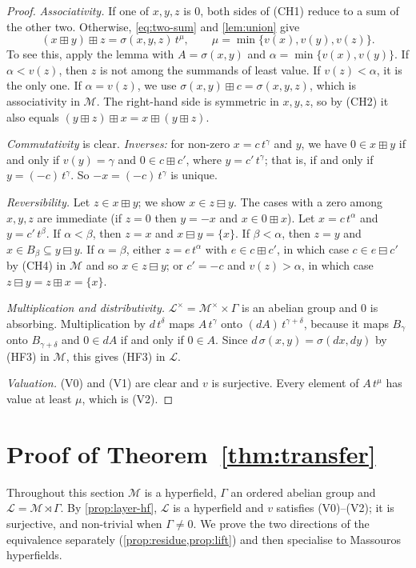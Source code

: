 \documentclass[11pt]{amsart}
\numberwithin{equation}{section}
\newcommand{\hplus}{\boxplus}
\newcommand{\hminus}{\boxminus}
\newcommand{\Mas}{\mathcal M}
\newcommand{\Lay}{\mathcal L}
\newcommand{\lt}[2]{#1\,t^{#2}}
\begin{document}
\begin{proof}
\emph{Associativity.} If one of $x,y,z$ is $0$, both sides of (CH1) reduce to a sum of the other two. Otherwise, \eqref{eq:two-sum} and \cref{lem:union} give
\[
 (x\hplus y)\hplus z=\lt{\sigma(x,y,z)}{\mu},\qquad \mu=\min\{v(x),v(y),v(z)\}.
\]
To see this, apply the lemma with $A=\sigma(x,y)$ and $\alpha=\min\{v(x),v(y)\}$. If $\alpha<v(z)$, then $z$ is not among the summands of least value. If $v(z)<\alpha$, it is the only one. If $\alpha=v(z)$, we use $\sigma(x,y)\hplus c=\sigma(x,y,z)$, which is associativity in $\Mas$. The right-hand side is symmetric in $x,y,z$, so by (CH2) it also equals $(y\hplus z)\hplus x=x\hplus(y\hplus z)$.

\emph{Commutativity} is clear. \emph{Inverses:} for non-zero $x=c\,t^\gamma$ and $y$, we have $0\in x\hplus y$ if and only if $v(y)=\gamma$ and $0\in c\hplus c'$, where $y=c'\,t^\gamma$; that is, if and only if $y=(-c)\,t^\gamma$. So $-x=(-c)\,t^\gamma$ is unique.

\emph{Reversibility.} Let $z\in x\hplus y$; we show $x\in z\hminus y$. The cases with a zero among $x,y,z$ are immediate (if $z=0$ then $y=-x$ and $x\in 0\hplus x$). Let $x=c\,t^\alpha$ and $y=c'\,t^\beta$. If $\alpha<\beta$, then $z=x$ and $x\hminus y=\{x\}$. If $\beta<\alpha$, then $z=y$ and $x\in B_\beta\subseteq y\hminus y$. If $\alpha=\beta$, either $z=e\,t^\alpha$ with $e\in c\hplus c'$, in which case $c\in e\hminus c'$ by (CH4) in $\Mas$ and so $x\in z\hminus y$; or $c'=-c$ and $v(z)>\alpha$, in which case $z\hminus y=z\hplus x=\{x\}$.

\emph{Multiplication and distributivity.} $\Lay^\times=\Mas^\times\times\Gamma$ is an abelian group and $0$ is absorbing. Multiplication by $d\,t^\delta$ maps $\lt{A}{\gamma}$ onto $\lt{(dA)}{\gamma+\delta}$, because it maps $B_\gamma$ onto $B_{\gamma+\delta}$ and $0\in dA$ if and only if $0\in A$. Since $d\,\sigma(x,y)=\sigma(dx,dy)$ by (HF3) in $\Mas$, this gives (HF3) in $\Lay$.

\emph{Valuation.} (V0) and (V1) are clear and $v$ is surjective. Every element of $\lt{A}{\mu}$ has value at least $\mu$, which is (V2).
\end{proof}

\section{Proof of Theorem~\ref{thm:transfer}}\label{sec:B}

Throughout this section $\Mas$ is a hyperfield, $\Gamma$ an ordered abelian group and $\Lay=\Mas\rtimes\Gamma$. By \cref{prop:layer-hf}, $\Lay$ is a hyperfield and $v$ satisfies (V0)--(V2); it is surjective, and non-trivial when $\Gamma\ne0$. We prove the two directions of the equivalence separately (\cref{prop:residue,prop:lift}) and then specialise to Massouros hyperfields.
\end{document}
